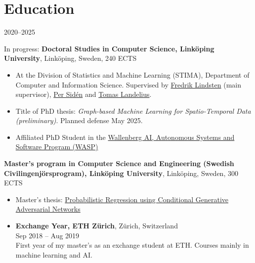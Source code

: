 \section*{Education}
\begin{labeling}{2020--2025}
    \item [2020--2025] In progress: \textbf{Doctoral Studies in Computer Science, Linköping University}, Linköping, Sweden, 240 ECTS
        \begin{itemize}
            \item At the Division of Statistics and Machine Learning (STIMA), Department of Computer and Information Science. Supervised by \href{https://lindsten.netlify.app/}{Fredrik Lindsten} (main supervisor), \href{https://scholar.google.se/citations?user=0UomzRIAAAAJ}{Per Sidén} and \href{https://www.smhi.se/en/research/research-departments/meteorology/tomas-landelius-1.4817}{Tomas Landelius}.
            \item Title of PhD thesis: \textit{Graph-based Machine Learning for Spatio-Temporal Data (preliminary)}.
            Planned defense May 2025.
            \item Affiliated PhD Student in the \href{https://wasp-sweden.org/}{Wallenberg AI, Autonomous Systems and Software Program (WASP)}
        \end{itemize}
    \item [2015--2020]
            \textbf{Master's program in Computer Science and Engineering (Swedish Civilingenjörsprogram), Linköping University}, Linköping, Sweden, 300 ECTS
        \begin{itemize}
            \item Master's thesis: \href{http://urn.kb.se/resolve?urn=urn:nbn:se:liu:diva-166637}{Probabilistic Regression using Conditional Generative Adversarial Networks}
            \item \textbf{Exchange Year, ETH Zürich}, Zürich, Switzerland\\
        Sep 2018 -- Aug 2019\\
            First year of my master's as an exchange student at ETH. Courses mainly in machine learning and AI.
        \end{itemize}
\end{labeling}
